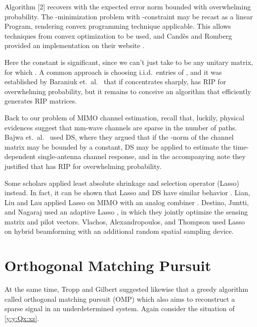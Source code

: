 Algorithm [2] recovers  with the expected error norm bounded with overwhelming probability.
The -minimization problem with \m {\ell_\infty}-constraint may be recast as a linear Program, rendering convex programming technique applicable.
This allows techniques from convex optimization to be used, and Candès and Romberg provided an implementation on their website \cite {CaR05}.

Here the constant  is significant, since we can't just take  to be any unitary matrix, for which .
A common approach is choosing i.i.d.\ entries of , and it was established by Baraniuk et.\ al.\ \cite {BDD08} that if  concentrates sharply,  has RIP for overwhelming probability, but it remains to conceive an algorithm that efficiently generates RIP matrices.

Back to our problem of MIMO channel estimation, recall that, luckily, physical evidences suggest that mm-wave channels are sparse in the number of paths.
Bajwa et.\ al.\ \cite {BHS10} used DS, where they argued that if the -norm of the channel matrix may be bounded by a constant, DS may be applied to estimate the time-dependent single-antenna channel response,
and in the accompanying note \cite {BHR08} they justified that  has RIP for overwhelming probability.

Some scholars applied least absolute shrinkage and selection operator (Lasso) instead.
In fact, it can be shown that Lasso and DS have similar behavior \cite {AsR10}.
Lian, Liu and Lau applied Lasso on MIMO with an analog combiner \cite {LLL17}.
Destino, Juntti, and Nagaraj used an adaptive Lasso \cite {DJN15}, in which they jointly optimize the sensing matrix and pilot vectors.
Vlachos, Alexandropoulos, and Thompson \cite {VAT19} used Lasso on hybrid beamforming with an additional random spatial sampling device.


\section {Orthogonal Matching Pursuit}

At the same time, Tropp and Gilbert \cite {TrG07b} suggested likewise that a greedy algorithm called orthogonal matching pursuit (OMP) which also aims to reconstruct a sparse signal in an underdetermined system.
Again consider the situation of \eqref {y:y:Qx:xz}.

